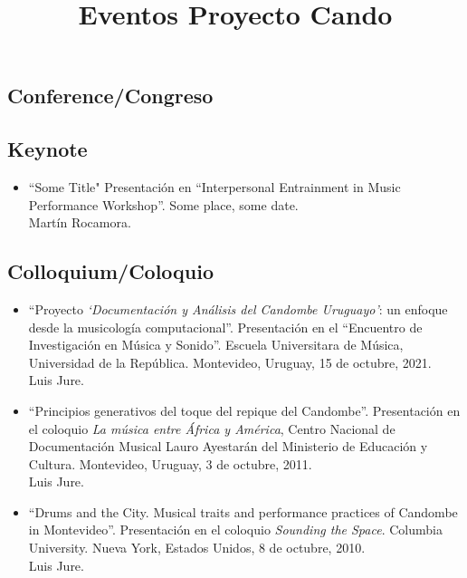 \documentclass[a4paper]{article}
\begin{document}
\title{Eventos Proyecto Cando} 
\author{}
\date{}
\maketitle

\subsection*{Conference/Congreso}


\subsection*{Keynote}

\begin{itemize}

\item[]	%
``Some Title"
Presentación en ``Interpersonal Entrainment in Music Performance Workshop''.
Some place, some date.\\
Martín Rocamora.

\end{itemize}

\subsection*{Colloquium/Coloquio}

\begin{itemize}

\item[]	%
``Proyecto \emph{`Documentación y Análisis del Candombe Uruguayo'}:
un enfoque desde la musicología computacional''.
Presentación en el ``Encuentro de Investigación en Música y Sonido''.
Escuela Universitara de Música, Universidad de la República.
Montevideo, Uruguay, 15 de octubre, 2021.\\
Luis Jure.

\item[ ]	%
``Principios generativos del toque del repique del Candombe''.
Presentación en el coloquio \emph{La música entre África y América}, Centro Nacional de Documentación
Musical Lauro Ayestarán del Ministerio de Educación y Cultura.
Montevideo, Uruguay, 3 de octubre, 2011.\\
Luis Jure.

\item[ ]	%
``Drums and the City. Musical traits and performance
practices of Candombe in Montevideo''.
Presentación en el coloquio \emph{Sounding the Space}.
Columbia University. 
Nueva York, Estados Unidos, 8 de octubre, 2010.\\
Luis Jure.

\end{itemize}
\end{document}
